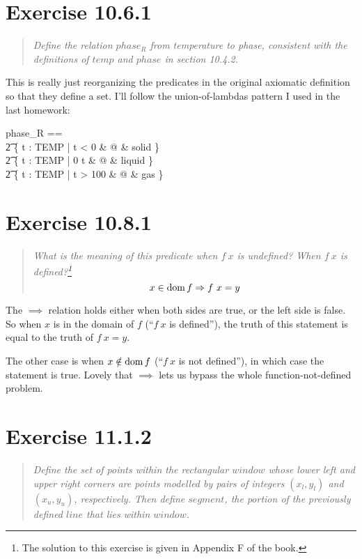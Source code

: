 \documentclass[10pt]{article}
\begin{document}
\section{Exercise 10.6.1}
\begin{quote}
  {\it Define the relation $phase_R$ from temperature to phase, consistent with the definitions of
    $temp$ and $phase$ in section 10.4.2.  }
\end{quote}

This is really just reorganizing the predicates in the original axiomatic definition so that they
define a set.  I'll follow the union-of-lambdas pattern I used in the last homework:

\begin{syntax}
  phase_R ==                                                         \\
  \t2 \{ \lambda t : TEMP | t < 0             & @ & solid \} \union  \\
  \t2 \{ \lambda t : TEMP | 0 \leq t  & @ & liquid \} \union \\
  \t2 \{ \lambda t : TEMP | t > 100           & @ & gas \}
\end{syntax}



\section{Exercise 10.8.1}
\begin{quote}
  {\it What is the meaning of this predicate when $f\ x$ is undefined?  When $f\ x$ is
    defined?\footnote{The solution to this exercise is given in Appendix F of the book.} }
  \[ x \in \mathop{\mathrm{dom}} f \Rightarrow f\ x = y \]
\end{quote}

The $\implies$ relation holds either when both sides are true, or the left side is false.  So when
$x$ is in the domain of $f$ (``$f\ x$ is defined''), the truth of this statement is equal to the
truth of $f\ x = y$.

The other case is when $x \notin \mathop{\mathrm{dom}} f$ (``$f\ x$ is not defined''), in which case the statement is
true.  Lovely that $\implies$ lets us bypass the whole function-not-defined problem.



\section{Exercise 11.1.2}
\begin{quote}
  {\it Define the set of points within the rectangular $window$ whose lower left and upper right
    corners are points modelled by pairs of integers $(x_l, y_l)$ and $(x_u, y_u)$, respectively.
    Then define $segment$, the portion of the previously defined $line$ that lies within $window$.
  }
\end{quote}
\end{document}
